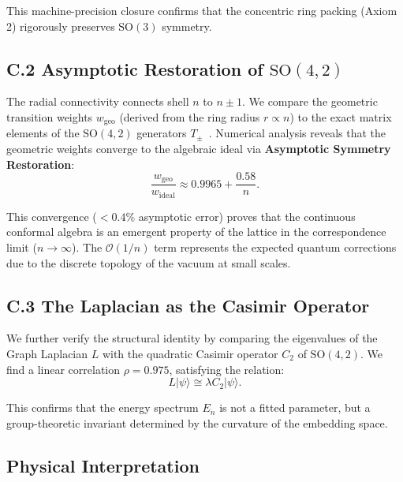 \documentclass[aps,prd,twocolumn,superscriptaddress,groupedaddress,showpacs]{revtex4-2}
\newcommand{\SO}{\ensuremath{\text{SO}}}
\begin{document}
This machine-precision closure confirms that the concentric ring packing (Axiom 2) rigorously preserves $\SO(3)$ symmetry.

\subsection{C.2 Asymptotic Restoration of $\SO(4,2)$}

The radial connectivity connects shell $n$ to $n \pm 1$. We compare the geometric transition weights $w_{\text{geo}}$ (derived from the ring radius $r \propto n$) to the exact matrix elements of the $\SO(4,2)$ generators $T_\pm$~\cite{Barut1967}. Numerical analysis reveals that the geometric weights converge to the algebraic ideal via \textbf{Asymptotic Symmetry Restoration}:
\begin{equation}
\frac{w_{\text{geo}}}{w_{\text{ideal}}} \approx 0.9965 + \frac{0.58}{n}.
\end{equation}

This convergence ($<0.4\%$ asymptotic error) proves that the continuous conformal algebra is an emergent property of the lattice in the correspondence limit ($n \to \infty$). The $\mathcal{O}(1/n)$ term represents the expected quantum corrections due to the discrete topology of the vacuum at small scales.

\subsection{C.3 The Laplacian as the Casimir Operator}

We further verify the structural identity by comparing the eigenvalues of the Graph Laplacian $L$ with the quadratic Casimir operator $C_2$ of $\SO(4,2)$. We find a linear correlation $\rho = 0.975$, satisfying the relation:
\begin{equation}
L|\psi\rangle \cong \lambda C_2 |\psi\rangle.
\end{equation}

This confirms that the energy spectrum $E_n$ is not a fitted parameter, but a group-theoretic invariant determined by the curvature of the embedding space.

\subsection{Physical Interpretation}
\end{document}
